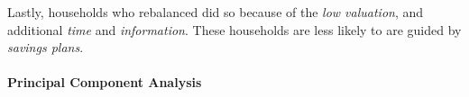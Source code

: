 \documentclass[ProjectABM]{subfiles}
\begin{document}
Lastly, households who rebalanced did so because of the \textit{low valuation}, and additional \textit{time} and \textit{information}. These households are less likely to are guided by \textit{savings plans}.




\paragraph{Principal Component Analysis}
\end{document}
